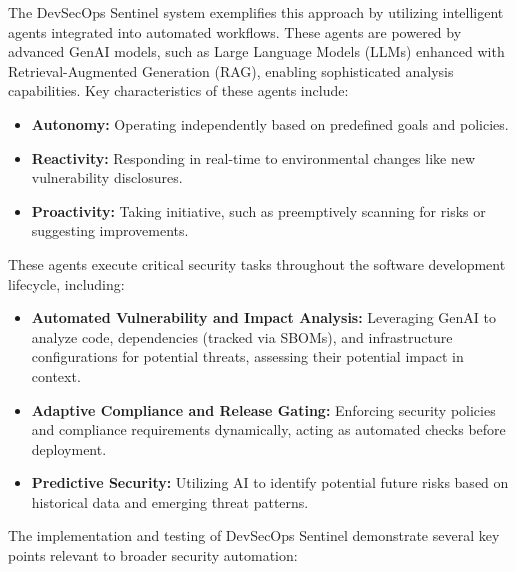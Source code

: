 The DevSecOps Sentinel system exemplifies this approach by utilizing intelligent agents integrated into automated workflows. These agents are powered by advanced GenAI models, such as Large Language Models (LLMs) enhanced with Retrieval-Augmented Generation (RAG), enabling sophisticated analysis capabilities\cite{noauthor_devsecops_nodate}. Key characteristics of these agents include:

\begin{itemize}
    \item \textbf{Autonomy:} Operating independently based on predefined goals and policies.
    \item \textbf{Reactivity:} Responding in real-time to environmental changes like new vulnerability disclosures.
    \item \textbf{Proactivity:} Taking initiative, such as preemptively scanning for risks or suggesting improvements\cite{noauthor_devsecops_nodate}.
\end{itemize}

These agents execute critical security tasks throughout the software development lifecycle, including:

\begin{itemize}
    \item \textbf{Automated Vulnerability and Impact Analysis:} Leveraging GenAI to analyze code, dependencies (tracked via SBOMs), and infrastructure configurations for potential threats, assessing their potential impact in context\cite{noauthor_devsecops_nodate}.
    \item \textbf{Adaptive Compliance and Release Gating:} Enforcing security policies and compliance requirements dynamically, acting as automated checks before deployment\cite{noauthor_devsecops_nodate}.
    \item \textbf{Predictive Security:} Utilizing AI to identify potential future risks based on historical data and emerging threat patterns\cite{noauthor_devsecops_nodate}.
\end{itemize}

The implementation and testing of DevSecOps Sentinel demonstrate several key points relevant to broader security automation:

